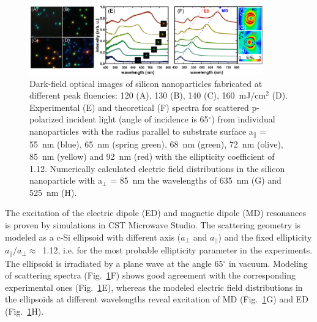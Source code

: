         \begin{figure}[!ht]
                \begin{center}
                    \includegraphics[width=0.9\textwidth]{figs/results/char/DarkField.eps}
                \end{center}
                \caption{Dark-field optical images of silicon nanoparticles fabricated at different peak fluencies:
                120 (A), 130 (B), 140 (C), 160~mJ/cm$^{2}$ (D). Experimental (E) and theoretical (F) spectra for
                scattered p-polarized incident light (angle of incidence is 65$^{\circ}$) from individual nanoparticles
                with the radius parallel to substrate surface a$_{\parallel}$ = 55~nm (blue), 65~nm (spring green),
                68~nm (green), 72~nm (olive), 85~nm (yellow) and 92~nm (red) with the ellipticity coefficient of 1.12.
                Numerically calculated electric field distributions in the silicon nanoparticle with a$_{\perp}$ = 85~nm
                 the wavelengths of 635~nm (G) and 525~nm (H).}
                \label{fig:Darkfield}
        \end{figure}


        The excitation of the electric dipole (ED) and magnetic dipole (MD) resonances is proven by simulations
        in CST Microwave Studio. The scattering geometry is modeled as a c-Si ellipsoid with different axis
        ($a_{\perp}$ and $a_{||}$) and the fixed ellipticity $a_{\parallel}/a_{\perp}\approx$~1.12, i.e. for
        the most probable ellipticity parameter in the experiments. The ellipsoid is irradiated by a plane wave
        at the angle 65$^{\circ}$ in vacuum. Modeling of scattering spectra (Fig.~\ref{fig:Darkfield}F) shows good agreement
        with the corresponding experimental ones (Fig.~\ref{fig:Darkfield}E), whereas the modeled electric field distributions
        in the ellipsoids at different wavelengths reveal excitation of MD (Fig.~\ref{fig:Darkfield}G) and ED (Fig.~\ref{fig:Darkfield}H).

    \subsection{}

